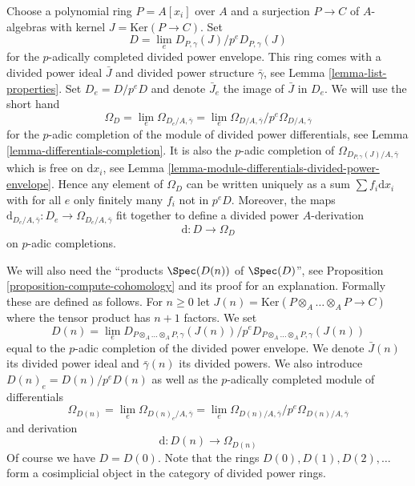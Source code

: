 \medskip\noindent
Choose a polynomial ring $P = A[x_i]$ over $A$ and a surjection $P \to C$
of $A$-algebras with kernel $J = \text{Ker}(P \to C)$. Set
\begin{equation}
\label{equation-D}
D = \lim_e D_{P, \gamma}(J) / p^eD_{P, \gamma}(J)
\end{equation}
for the $p$-adically completed divided power envelope.
This ring comes with a divided power ideal $\bar J$ and divided power
structure $\bar \gamma$, see Lemma \ref{lemma-list-properties}.
Set $D_e = D/p^eD$ and denote $\bar J_e$ the image of $\bar J$ in $D_e$.
We will use the short hand
\begin{equation}
\label{equation-omega-D}
\Omega_D = \lim_e \Omega_{D_e/A, \bar\gamma} =
\lim_e \Omega_{D/A, \bar\gamma}/p^e\Omega_{D/A, \bar\gamma}
\end{equation}
for the $p$-adic completion of the module of divided power differentials,
see Lemma \ref{lemma-differentials-completion}.
It is also the $p$-adic completion of
$\Omega_{D_{P, \gamma}(J)/A, \bar\gamma}$
which is free on $\text{d}x_i$, see
Lemma \ref{lemma-module-differentials-divided-power-envelope}.
Hence any element of $\Omega_D$ can be written uniquely as a sum
$\sum f_i\text{d}x_i$ with for all $e$ only finitely many $f_i$
not in $p^eD$. Moreover, the maps
$\text{d}_{D_e/A, \bar\gamma} : D_e \to \Omega_{D_e/A, \bar\gamma}$
fit together to define a divided power $A$-derivation
\begin{equation}
\label{equation-derivation-D}
\text{d} : D \longrightarrow \Omega_D
\end{equation}
on $p$-adic completions.

\medskip\noindent
We will also need the ``products $\Spec(D(n))$ of $\Spec(D)$'', see
Proposition \ref{proposition-compute-cohomology} and its proof for an
explanation. Formally these are defined as follows. For $n \geq 0$ let
$J(n) = \text{Ker}(P \otimes_A \ldots \otimes_A P \to C)$ where
the tensor product has $n + 1$ factors. We set
\begin{equation}
\label{equation-Dn}
D(n) = \lim_e
D_{P \otimes_A \ldots \otimes_A P, \gamma}(J(n))/
p^eD_{P \otimes_A \ldots \otimes_A P, \gamma}(J(n))
\end{equation}
equal to the $p$-adic completion of the divided power envelope.
We denote $\bar J(n)$ its divided power ideal and $\bar \gamma(n)$
its divided powers. We also introduce $D(n)_e = D(n)/p^eD(n)$ as well
as the $p$-adically completed module of differentials
\begin{equation}
\label{equation-omega-Dn}
\Omega_{D(n)} = \lim_e \Omega_{D(n)_e/A, \bar\gamma} =
\lim_e \Omega_{D(n)/A, \bar\gamma}/p^e\Omega_{D(n)/A, \bar\gamma}
\end{equation}
and derivation
\begin{equation}
\label{equation-derivation-Dn}
\text{d} : D(n) \longrightarrow \Omega_{D(n)}
\end{equation}
Of course we have $D = D(0)$. Note that the rings $D(0), D(1), D(2), \ldots$
form a cosimplicial object in the category of divided power rings.

